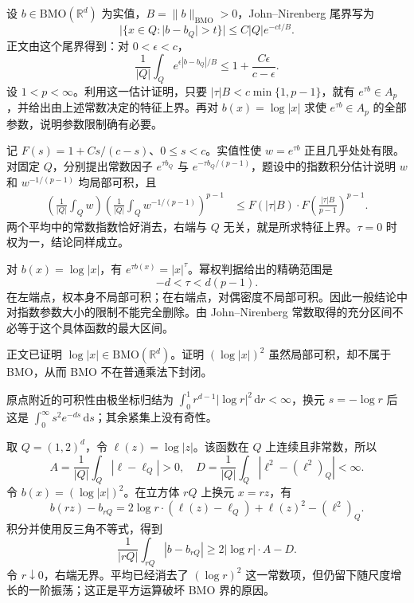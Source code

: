 \begin{exercise}\label{b2:ex:app-C-2}
设 \(b\in\mathrm{BMO}(\mathbb R^d)\) 为实值，\(B=\|b\|_{\mathrm{BMO}}>0\)，John--Nirenberg 尾界写为
\[
 |\{x\in Q:|b-b_Q|>t\}|\leq C|Q|e^{-ct/B}.
\]
正文由这个尾界得到：对 \(0<\epsilon<c\)，
\[
 \frac1{|Q|}\int_Qe^{\epsilon|b-b_Q|/B}
 \leq 1+\frac{C\epsilon}{c-\epsilon}.
\]
设 \(1<p<\infty\)。利用这一估计证明，只要
\( |\tau|B<c\min\{1,p-1\}\)，就有 \(e^{\tau b}\in A_p\)，并给出由上述常数决定的特征上界。再对 \(b(x)=\log|x|\) 求使 \(e^{\tau b}\in A_p\) 的全部参数，说明参数限制确有必要。
\end{exercise}
\begin{solution}
记 \(F(s)=1+Cs/(c-s)\)、\(0\leq s<c\)。实值性使 \(w=e^{\tau b}\) 正且几乎处处有限。对固定 \(Q\)，分别提出常数因子 \(e^{\tau b_Q}\) 与 \(e^{-\tau b_Q/(p-1)}\)，题设中的指数积分估计说明 \(w\) 和 \(w^{-1/(p-1)}\) 均局部可积，且
\[
 \begin{aligned}
 \left(\frac1{|Q|}\int_Qw\right)
 \left(\frac1{|Q|}\int_Qw^{-1/(p-1)}\right)^{p-1}
 &\leq F(|\tau|B)\cdot
       F\left(\frac{|\tau|B}{p-1}\right)^{p-1}.
 \end{aligned}
\]
两个平均中的常数指数恰好消去，右端与 \(Q\) 无关，就是所求特征上界。\(\tau=0\) 时权为一，结论同样成立。

对 \(b(x)=\log|x|\)，有 \(e^{\tau b(x)}=|x|^\tau\)。幂权判据给出的精确范围是
\[
 -d<\tau<d(p-1).
\]
在左端点，权本身不局部可积；在右端点，对偶密度不局部可积。因此一般结论中对指数参数大小的限制不能完全删除。由 John--Nirenberg 常数取得的充分区间不必等于这个具体函数的最大区间。
\end{solution}

\begin{exercise}\label{b2:ex:app-C-3}
正文已证明 \(\log|x|\in\mathrm{BMO}(\mathbb R^d)\)。证明 \((\log|x|)^2\) 虽然局部可积，却不属于 BMO，从而 BMO 不在普通乘法下封闭。
\end{exercise}
\begin{solution}
原点附近的可积性由极坐标归结为
\(\int_0^1 r^{d-1}|\log r|^2\,\mathrm dr<\infty\)，换元 \(s=-\log r\) 后这是 \(\int_0^\infty s^2e^{-ds}\,\mathrm ds\)；其余紧集上没有奇性。

取 \(Q=(1,2)^d\)，令 \(\ell(z)=\log|z|\)。该函数在 \(Q\) 上连续且非常数，所以
\[
 A=\frac1{|Q|}\int_Q|\ell-\ell_Q|>0,\quad
 D=\frac1{|Q|}\int_Q|\ell^2-(\ell^2)_Q|<\infty.
\]
令 \(b(x)=(\log|x|)^2\)。在立方体 \(rQ\) 上换元 \(x=rz\)，有
\[
 b(rz)-b_{rQ}
 =2\log r\cdot(\ell(z)-\ell_Q)
   +\ell(z)^2-(\ell^2)_Q.
\]
积分并使用反三角不等式，得到
\[
 \frac1{|rQ|}\int_{rQ}|b-b_{rQ}|
 \geq2|\log r|\cdot A-D.
\]
令 \(r\downarrow0\)，右端无界。平均已经消去了 \((\log r)^2\) 这一常数项，但仍留下随尺度增长的一阶振荡；这正是平方运算破坏 BMO 界的原因。
\end{solution}

